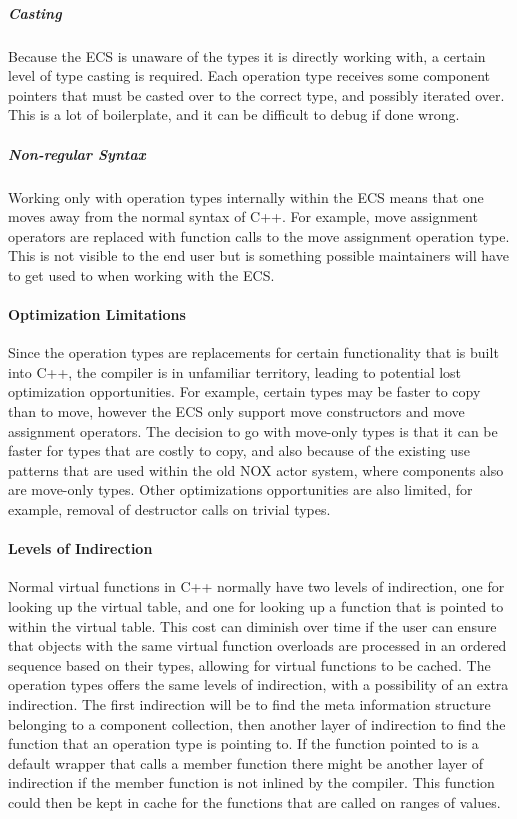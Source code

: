 \subparagraph{Casting}
Because the ECS is unaware of the types it is directly working with, a certain level of type casting is required.
Each operation type receives some component pointers that must be casted over to the correct type, and possibly iterated over. 
This is a lot of boilerplate, and it can be difficult to debug if done wrong.

\subparagraph{Non-regular Syntax}
Working only with operation types internally within the ECS means that one moves away from the normal syntax of C++.
For example, move assignment operators are replaced with function calls to the move assignment operation type.
This is not visible to the end user but is something possible maintainers will have to get used to when working with the ECS.

\paragraph{Optimization Limitations}
Since the operation types are replacements for certain functionality that is built into C++, the compiler is in
unfamiliar territory, leading to potential lost optimization opportunities.
For example, certain types may be faster to copy than to move, however the ECS only support move constructors and move assignment operators.
The decision to go with move-only types is that it can be faster for types that are costly to copy, and also because of the existing use patterns that are used within the old NOX actor system, where components also are move-only types.
Other optimizations opportunities are also limited, for example, removal of destructor calls on trivial types.


\paragraph{Levels of Indirection}
Normal virtual functions in C++ normally have two levels of indirection, one for looking up the virtual table, and one for looking up a function that is pointed to within the virtual table.
This cost can diminish over time if the user can ensure that objects with the same virtual function overloads are processed in an ordered sequence based on their types, allowing for virtual functions to be cached.
The operation types offers the same levels of indirection, with a possibility of an extra indirection.
The first indirection will be to find the meta information structure belonging to a component collection, then another layer of indirection to find the function that an operation type is pointing to.
If the function pointed to is a default wrapper that calls a member function there might be another layer of indirection if the member function is not inlined by the compiler.
This function could then be kept in cache for the functions that are called on ranges of values.
